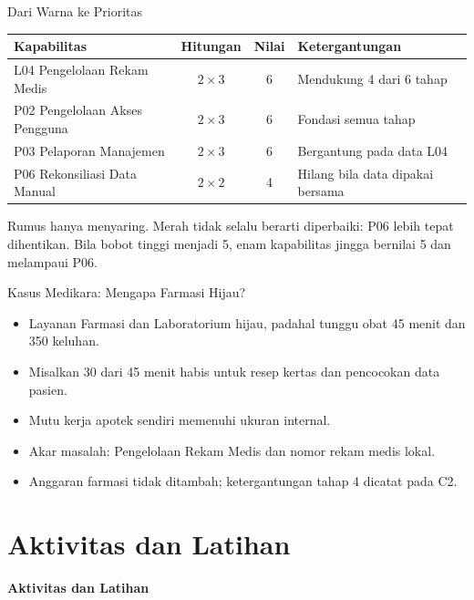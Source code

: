 \documentclass[aspectratio=169, table, 12pt]{beamer}
\begin{document}
\begin{frame}{{\Large Dari Warna ke Prioritas}}
  \footnotesize
  \begin{tabularx}{\textwidth}{>{\raggedright\arraybackslash}p{5.0cm} c c
      >{\raggedright\arraybackslash}X}
    \hline
    \textbf{Kapabilitas} & \textbf{Hitungan} & \textbf{Nilai} & \textbf{Ketergantungan} \\
    \hline
    L04 Pengelolaan Rekam Medis & $2 \times 3$ & 6 & Mendukung 4 dari 6 tahap \\
    \hline
    P02 Pengelolaan Akses Pengguna & $2 \times 3$ & 6 & Fondasi semua tahap \\
    \hline
    P03 Pelaporan Manajemen & $2 \times 3$ & 6 & Bergantung pada data L04 \\
    \hline
    P06 Rekonsiliasi Data Manual & $2 \times 2$ & 4 & Hilang bila data dipakai bersama \\
    \hline
  \end{tabularx}

  \vspace{8pt}
  \small Rumus hanya menyaring. Merah tidak selalu berarti diperbaiki: P06 lebih tepat dihentikan.
  Bila bobot tinggi menjadi 5, enam kapabilitas jingga bernilai 5 dan melampaui P06.
\end{frame}

\begin{frame}{{\Large Kasus Medikara: Mengapa Farmasi Hijau?}}
  \vspace{10pt}
  \begin{itemize}
    \item Layanan Farmasi dan Laboratorium hijau, padahal tunggu obat 45 menit dan 350 keluhan.
    \item Misalkan 30 dari 45 menit habis untuk resep kertas dan pencocokan data pasien.
    \item Mutu kerja apotek sendiri memenuhi ukuran internal.
    \item Akar masalah: Pengelolaan Rekam Medis dan nomor rekam medis lokal.
    \item Anggaran farmasi tidak ditambah; ketergantungan tahap 4 dicatat pada C2.
  \end{itemize}
\end{frame}

\section{Aktivitas dan Latihan}

\begin{frame}{\hfill}
  \centering
  \Huge{\textbf{Aktivitas dan Latihan}}
\end{frame}
\end{document}

